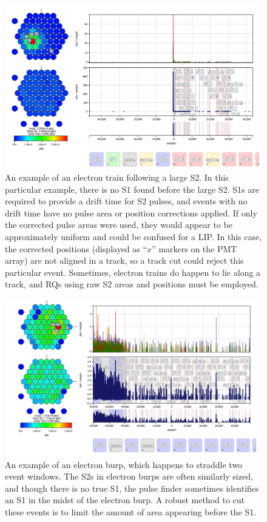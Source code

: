 \begin{figure}[htbp]
\begin{center}
\includegraphics[width=\textwidth]{figures/lips/etrain.png}
\caption{An example of an electron train following a large S2. In this particular example, there is no S1 found before the large S2. S1s are required to provide a drift time for S2 pulses, and events with no drift time have no pulse area or position corrections applied. If only the corrected pulse areas were used, they would appear to be approximately uniform and could be confused for a \acs{LIP}. In this case, the corrected positions (displayed as ``$x$'' markers on the \acs{PMT} array) are not aligned in a track, so a track cut could reject this particular event. Sometimes, electron trains do happen to lie along a track, and \acs{RQ}s using raw S2 areas and positions must be employed. }
\label{fig:etrain_lip}
\end{center}
\end{figure}

\begin{figure}[htbp]
\begin{center}
\includegraphics[width=\textwidth]{figures/lips/eburp.png}
\caption{An example of an electron burp, which happens to straddle two event windows. The S2s in electron burps are often similarly sized, and though there is no true S1, the pulse finder sometimes identifies an S1 in the midst of the electron burp. A robust method to cut these events is to limit the amount of area appearing before the S1.}
\label{fig:eburp_lip}
\end{center}
\end{figure}

